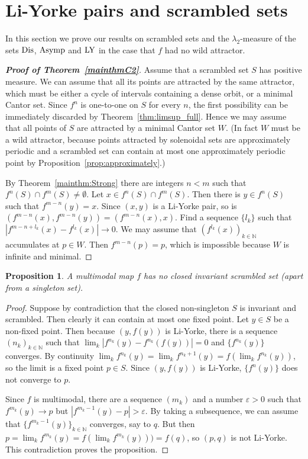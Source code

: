 \documentclass[12pt, psamsfonts, reqno]{amsart}
\newtheorem{proposition}[theorem]{Proposition}
\begin{document}
\section{Li-Yorke pairs and scrambled sets}\label{sec:scrambled}

In this section we prove our results on scrambled sets and the
$\lambda_2$-measure  of the sets ${\mathop{\rm Dis}\nolimits}$, ${\mathop{\rm Asymp}\nolimits}$ and ${\mathop{\rm LY}\nolimits}$ in the case
that $f$ had no wild attractor.

\begin{proof}[\textbf{Proof of Theorem~\ref{mainthmC2}}]
 Assume that a scrambled set $S$ has positive measure. We can
 assume that all its points are attracted by the same attractor,
 which must be either a cycle of intervals containing a dense orbit,
 or a minimal Cantor set. Since $f^n$ is one-to-one on $S$ for every $n$,
 the first possibility can be immediately discarded
 by  Theorem~\ref{thm:limsup_full}. Hence we may assume that all points
 of $S$ are attracted by a minimal Cantor set $W$. (In fact
 $W$ must be a wild attractor, because points
 attracted by solenoidal sets are approximately periodic and a
 scrambled set can contain at most one approximately periodic
 point by Proposition~\ref{prop:approximately}.)

 By Theorem~\ref{mainthm:Strong} there are integers $n<m$ such that
 $f^n(S)\cap f^m(S)\neq \emptyset$. Let $x\in f^n(S)\cap
 f^m(S)$. Then there is $y\in f^n(S)$ such that $f^{m-n}(y)=x$.
 Since $(x,y)$ is a Li-Yorke pair, so is $(f^{m-n}(x),
 f^{m-n}(y))=(f^{m-n}(x),x)$. Find a sequence $\{l_k\}$ such that
 $|f^{m-n+l_k}(x)-f^{l_k}(x)|\to 0$. We may assume that
 $(f^{l_k}(x))_{k \in {{\mathbb N}}}$ accumulates at $p\in W$. Then $f^{m-n}(p)=p$,
 which is impossible because $W$ is infinite and minimal.
\end{proof}

\begin{proposition}\label{prop:noinvscramb}
A multimodal map $f$ has no closed invariant scrambled
set (apart from a singleton set).
\end{proposition}

\begin{proof}
Suppose by contradiction that the closed non-singleton $S$ is
invariant and scrambled. Then clearly it can contain at most one
fixed point. Let $y \in S$ be a non-fixed point. Then because
$(y,f(y))$ is Li-Yorke, there is a sequence $(n_k)_{k \in {{\mathbb N}}}$
such that $\lim_k |f^{n_k}(y)- f^{n_k}(f(y))| = 0$ and $\{
f^{n_k}(y) \}$ converges. By continuity $\lim_k f^{n_k}(y) =
\lim_k f^{n_k+1}(y) = f(\lim_k f^{n_k}(y))$, so the limit is a
fixed point $p\in S$. Since $(y,f(y))$ is Li-Yorke, $\{f^n(y)\}$
does not converge to $p$.

Since $f$ is multimodal, there are a sequence $(m_k)$ and a number
${\varepsilon}>0$ such that $f^{m_k}(y) \to p$ but $|f^{m_k-1}(y)-p|>{\varepsilon}$.
By taking a subsequence, we can assume that $\{ f^{m_k-1}(y)\}_{k
\in {{\mathbb N}}}$ converges, say to $q$. But then $p = \lim_k f^{m_k}(y) =
f(\lim_k f^{m_k}(y))) = f(q)$, so $(p,q)$ is not Li-Yorke. This
contradiction proves the proposition.
\end{proof}
\end{document}

